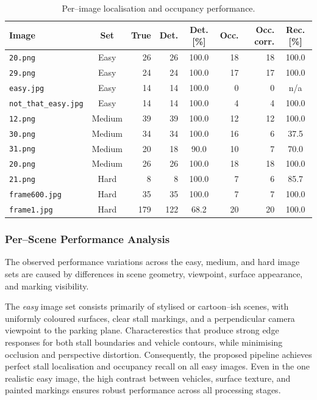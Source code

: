 \documentclass[9pt,journal]{IEEEtran}
\begin{document}
	\begin{table}[!t]
		\centering
		\footnotesize
		\caption{Per--image localisation and occupancy performance.}
		\label{tab:quant_results}
		\begin{tabular}{|l|c|r|r|c|r|r|c|}
			\hline
			Image                & Set & True & Det. & Det. [\%] & Occ. & Occ. corr. & Rec. [\%] \\
			\hline
			\texttt{20.png}              & Easy   & 26  & 26  & 100.0 & 18 & 18 & 100.0 \\
			\texttt{29.png}              & Easy   & 24  & 24  & 100.0 & 17 & 17 & 100.0 \\
			\texttt{easy.jpg}            & Easy   & 14  & 14  & 100.0 &  0 &  0 & n/a   \\
			\texttt{not\_that\_easy.jpg} & Easy   & 14  & 14  & 100.0 &  4 &  4 & 100.0 \\
			\hline
			\texttt{12.png}              & Medium & 39  & 39  & 100.0 & 12 & 12 & 100.0 \\
			\texttt{30.png}              & Medium & 34  & 34  & 100.0 & 16 &  6 &  37.5 \\
			\texttt{31.png}              & Medium & 20  & 18  &  90.0 & 10 &  7 &  70.0 \\
			\texttt{20.png}              & Medium & 26  & 26  & 100.0 & 18 & 18 & 100.0 \\
			\hline
			\texttt{21.png}              & Hard   &  8  &  8  & 100.0 &  7 &  6 &  85.7 \\
			\texttt{frame600.jpg}        & Hard   & 35  & 35  & 100.0 &  7 &  7 & 100.0 \\
			\texttt{frame1.jpg}          & Hard   & 179 & 122 &  68.2 & 20 & 20 & 100.0 \\
			\hline
		\end{tabular}
	\end{table}
	
	\subsubsection{Per--Scene Performance Analysis}
	
	The observed performance variations across the easy, medium, and hard image sets are caused by differences in scene geometry, viewpoint, surface appearance, and marking visibility.
	
	The \emph{easy} image set consists primarily of stylised or cartoon--ish scenes, with uniformly coloured surfaces, clear stall markings, and a perpendicular camera viewpoint to the parking plane. Characterestics that produce strong edge responses for both stall boundaries and vehicle contours, while minimising occlusion and perspective distortion.
	Consequently, the proposed pipeline achieves perfect stall localisation and occupancy recall on all easy images. Even in the one realistic easy image, the high contrast between vehicles, surface texture, and painted markings ensures robust performance across all processing stages.
	
\end{document}

